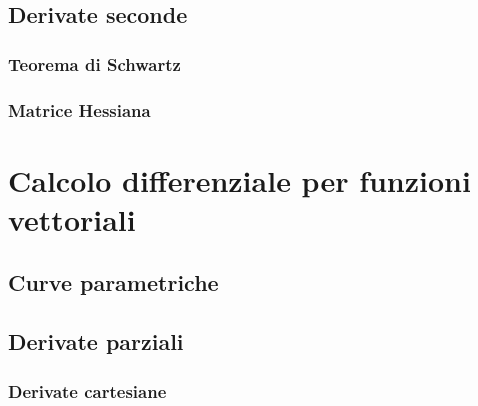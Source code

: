 \documentclass[x11names]{article}
\begin{document}

	\subsection{Derivate seconde}

	\begin{center}
	\colorbox{myred}{\begin{minipage}{5.75in}
		\begin{redes}{}
		\subsubsection{Teorema di Schwartz}
		\end{redes}
	\end{minipage}}        
	\end{center}

		\subsubsection{Matrice Hessiana}




\newpage
\section{Calcolo differenziale per funzioni vettoriali}
	\subsection{Curve parametriche}
	
	\subsection{Derivate parziali}
		\subsubsection{Derivate cartesiane}
\end{document}
